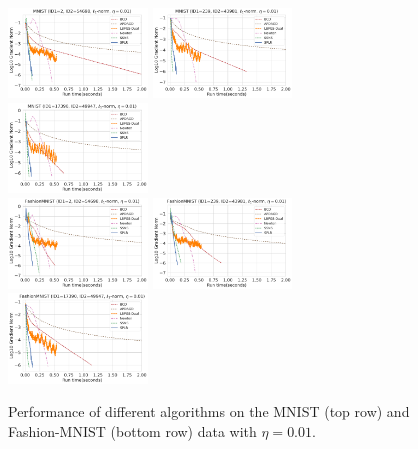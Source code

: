 \documentclass{article}
\theoremstyle{plain}
\theoremstyle{definition}
\theoremstyle{remark}
\begin{document}
\begin{figure}[p]
    \centering
    \includegraphics[width=0.33\textwidth]{save/MNIST - Extra/run_times/ID1=2, ID2=54698, norm=l1, reg=0.01}
    \includegraphics[width=0.33\textwidth]{save/MNIST - Extra/run_times/ID1=239, ID2=43981, norm=l1, reg=0.01}
    \includegraphics[width=0.33\textwidth]{save/MNIST - Extra/run_times/ID1=17390, ID2=49947, norm=l1, reg=0.01}\\
    \includegraphics[width=0.33\textwidth]{save/FashionMNIST - Extra/run_times/ID1=2, ID2=54698, norm=l1, reg=0.01}
    \includegraphics[width=0.33\textwidth]{save/FashionMNIST - Extra/run_times/ID1=239, ID2=43981, norm=l1, reg=0.01}
    \includegraphics[width=0.33\textwidth]{save/FashionMNIST - Extra/run_times/ID1=17390, ID2=49947, norm=l1, reg=0.01}
    \caption{Performance of different algorithms on the MNIST (top row) and Fashion-MNIST (bottom row) data with $\eta=0.01$.}
    \label{fig:mnist_eta_0.01}
\end{figure}
\end{document}
